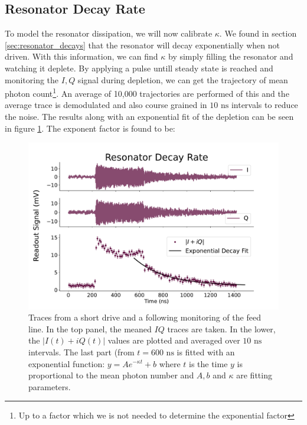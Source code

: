 \subsection{Resonator Decay Rate}
To model the resonator dissipation, we will now calibrate $\kappa$. We found in section \ref{sec:resonator_decays} that the resonator will decay exponentially when not driven. With this information, we can find $\kappa$ by simply filling the resonator and watching it deplete. By applying a pulse untill steady state is reached and monitoring the $I, Q$ signal during depletion, we can get the trajectory of mean photon count\footnote{Up to a factor which we is not needed to determine the exponential factor}. An average of 10,000 trajectories are performed of this and the average trace is demodulated and also course grained in $10 \text{ ns}$ intervals to reduce the noise. The results along with an exponential fit of the depletion can be seen in figure \ref{fig:calibration_of_kappa}. The exponent factor is found to be:
\begin{figure}[h]
    \centering
    \includegraphics{Calibrations/Figures/Resonator Decay Rate.pdf}
    \caption{Traces from a short drive and a following monitoring of the feed line. In the top panel, the meaned $IQ$ traces are taken. In the lower, the $|I(t) + iQ(t)|$ values are plotted and averaged over $10 \text{ ns}$ intervals. The last part (from $t = 600 \text{ ns}$ is fitted with an exponential function: $y = Ae^{-\kappa t} + b$ where $t$ is the time $y$ is proportional to the mean photon number and $A, b$ and $\kappa$ are fitting parameters.}
    \label{fig:calibration_of_kappa}
\end{figure}
